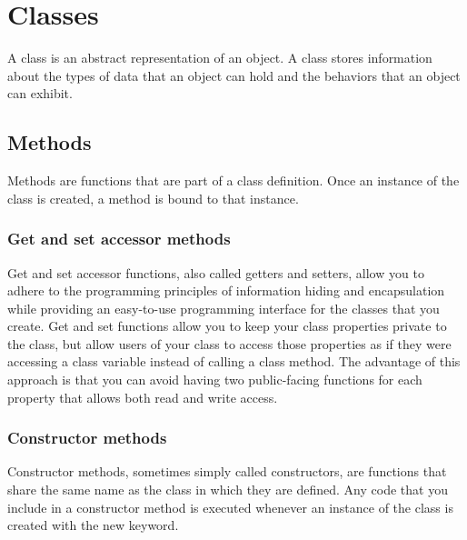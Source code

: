 \section{Classes}

%
A class is an abstract representation of an object. 
A class stores information about the types of data 
that an object can hold and the behaviors that an 
object can exhibit.

\subsection{Methods}
Methods are functions that are part of a class 
definition. Once an instance of the class is created, 
a method is bound to that instance.

	\subsubsection{Get and set accessor methods}
	Get and set accessor functions, also called getters 
	and setters, allow you to adhere to the programming principles of 
	information hiding and encapsulation while providing an 
	easy-to-use programming interface for the classes that you 
	create. Get and set functions allow you to keep your class 
	properties private to the class, but allow users of your class 
	to access those properties as if they were accessing a 
	class variable instead of calling a class method. 
	The advantage of this approach is that you can avoid 
	having two public-facing functions for each property 
	that allows both read and write access.
	
	\subsubsection{Constructor methods}
	Constructor methods, sometimes simply called constructors, 
	are functions that share the same name as the class in 
	which they are defined. Any code that you include in 
	a constructor method is executed whenever an instance of the 
	class is created with the  new  keyword.
